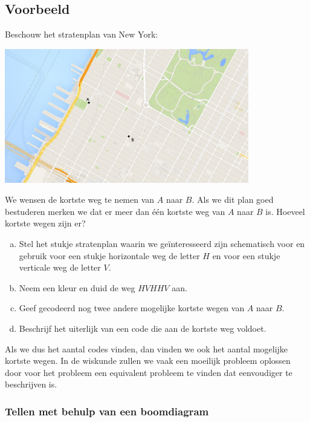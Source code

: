 \documentclass[12pt,twoside]{article}
\begin{document}
\begin{theorie}

\subsection{Voorbeeld}

Beschouw het stratenplan van New York:
\begin{center}
\includegraphics[width=0.8\textwidth]{NY_grid}
\end{center}

We wensen de kortste weg te nemen van $A$ naar $B$. Als we dit plan goed bestuderen merken we dat er meer dan één kortste weg van $A$ naar $B$ is. Hoeveel kortste wegen zijn er?

\begin{enumerate}[(a)]
  \item Stel het stukje stratenplan waarin we geïnteresseerd zijn schematisch voor en gebruik voor een stukje horizontale weg de letter $H$ en voor een stukje verticale weg de letter $V$.
\ruitjes{4cm}
  \item Neem een kleur en duid de weg $HVHHV$ aan.
  \item Geef gecodeerd nog twee andere mogelijke kortste wegen van $A$ naar $B$.
  \item Beschrijf het uiterlijk van een code die aan de kortste weg voldoet.
\end{enumerate}

Als we dus het aantal codes vinden, dan vinden we ook het aantal mogelijke kortste wegen. In de wiskunde zullen we vaak een moeilijk probleem oplossen door voor het probleem een equivalent probleem te vinden dat eenvoudiger te beschrijven is.

\subsubsection{Tellen met behulp van een boomdiagram}


\end{theorie}
\end{document}
